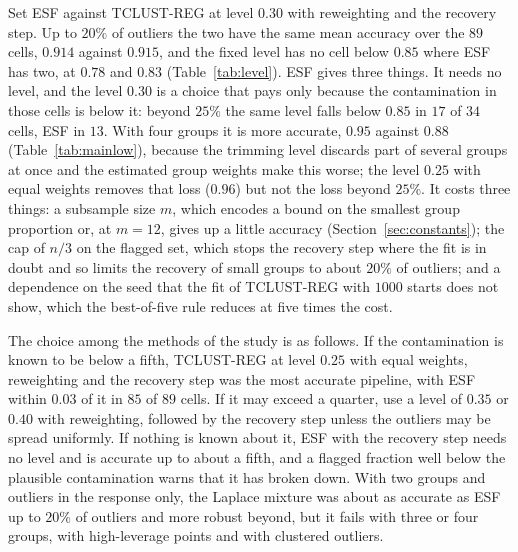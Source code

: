 Set ESF against TCLUST-REG at level $0.30$ with reweighting and the recovery step. Up to
$20\%$ of outliers the two have the same mean accuracy over
the $89$ cells, $0.914$ against $0.915$, and the fixed level has no cell below $0.85$ where ESF
has two, at $0.78$ and $0.83$ (Table~\ref{tab:level}). ESF gives three things. It needs no
level, and the level $0.30$ is a choice that pays only because the contamination in those
cells is below it: beyond $25\%$ the same level falls below $0.85$ in $17$ of $34$ cells,
ESF in $13$. With four groups it is more accurate, $0.95$ against $0.88$
(Table~\ref{tab:mainlow}), because the trimming level discards part of several groups at once
and the estimated group weights make this worse; the level $0.25$ with equal weights removes
that loss ($0.96$) but not the loss beyond $25\%$. It costs three things: a subsample size $m$,
which encodes a bound on the smallest group proportion or, at $m=12$, gives up a little
accuracy (Section~\ref{sec:constants}); the cap of $n/3$ on the flagged set, which stops the
recovery step where the fit is in doubt and so limits the recovery of small groups to about
$20\%$ of outliers; and a dependence on the seed that the fit of TCLUST-REG with $1000$ starts does
not show, which the best-of-five rule reduces at five times the cost.

The choice among the methods of the study is as follows. If the contamination is known to be
below a fifth, TCLUST-REG at level $0.25$ with equal weights, reweighting and the recovery step
was the most accurate pipeline, with ESF within $0.03$ of it in $85$ of $89$ cells. If it may exceed a
quarter, use a level of $0.35$ or $0.40$ with reweighting, followed by the recovery step unless the
outliers may be spread uniformly. If nothing is known about it, ESF with the recovery step
needs no level and is accurate up to about a fifth, and a flagged fraction well below the
plausible contamination warns that it has broken down. With two groups and outliers in the response only, the Laplace
mixture was about as accurate as ESF up to $20\%$ of outliers and more robust beyond, but it
fails with three or four groups, with high-leverage points and with clustered outliers.

